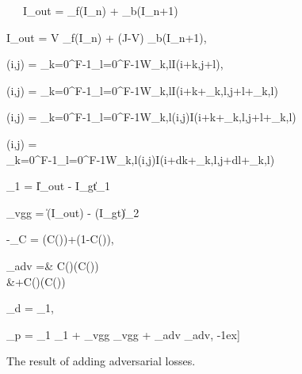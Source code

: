 \documentclass[10pt,twocolumn,letterpaper]{article}
\begin{document}
\begin{figure}
	\setlength{\belowcaptionskip}{-24pt}
	\begin{center}
		\,
		\hfill
		\,
		\hfill
		\
I_{out} = _{f}(I_n) + _{b}(I_{n+1})
\label{eq:base}

I_{out} = V \odot {}_{f}(I_n) + (J-V) \odot {}_{b}(I_{n+1}),

(i,j) = \sum_{k=0}^{F-1}{\sum_{l=0}^{F-1}{W_{k,l}I(i+k,j+l)}},

(i,j) = \sum_{k=0}^{F-1}{\sum_{l=0}^{F-1}{W_{k,l}I(i+k+\alpha_{k,l},j+l+\beta_{k,l})}}

(i,j) = \sum_{k=0}^{F-1}{\sum_{l=0}^{F-1}{W_{k,l}(i,j)I(i+k+\alpha_{k,l},j+l+\beta_{k,l})}}

\begin{multlined}
(i,j) =\\
\sum_{k=0}^{F-1}{\sum_{l=0}^{F-1}{W_{k,l}(i,j)I(i+dk+\alpha_{k,l},j+dl+\beta_{k,l})}}
\end{multlined}

_1 = \|I_{out} - I_{gt}\|_1

_{vgg} = \|(I_{out}) - (I_{gt})\|_2

-_C = \log(C())+\log(1-C()),

\begin{aligned}
_{adv} =& C()\log(C())\\
&+C()\log(C(\left[I_{out}, I_{n+1}\right]))
\end{aligned}

_d = _1,

_p = \lambda_1 _1 + \lambda_{vgg} _{vgg} + \lambda_{adv} _{adv},
-1ex]
		\,
		\,
		\caption{The result of adding adversarial losses.}
		\label{fig:gan}
	\end{center}
\end{figure}
\end{document}
